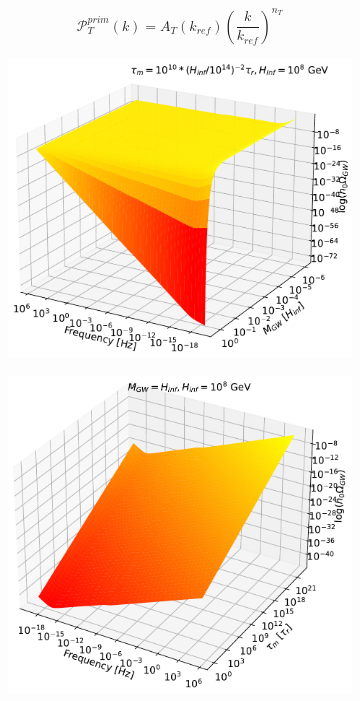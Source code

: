 \documentclass[prd,twocolumn,aps,psfig,nofootinbib,nobibnotes,superscriptaddress,preprintnumbers,times]{revtex4-2}
\begin{document}
\begin{equation}\label{eqn:23}
    \mathcal{P}_{T}^{prim}(k) = A_T(k_{ref})\left(\frac{k}{k_{ref}}\right)^{n_T}
\end{equation}
\begin{figure}[H]
\begin{subfigure}{.5\textwidth}
  \centering
  \includegraphics[width=.82\linewidth]{fig/fig4a.pdf}  
  \label{fig:contour-a}
\end{subfigure}
\begin{subfigure}{.5\textwidth}
  \centering
  \includegraphics[width=.82\linewidth]{fig/fig4b.pdf}  
  \label{fig:contour-b}
\end{subfigure}
\begin{subfigure}{.5\textwidth}

\end{subfigure}
\end{figure}
\end{document}

